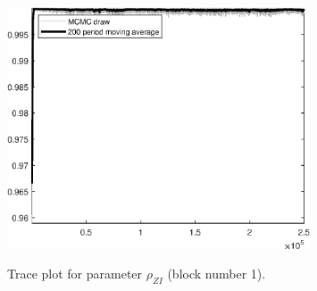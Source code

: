 \begin{figure}[H]
\centering
  \includegraphics[width=0.8\textwidth]{BRS_extended_fd/graphs/TracePlot_rho_ZI_blck_1}\\
    \caption{Trace plot for parameter ${\rho_{ZI}}$ (block number 1).}
\end{figure}
